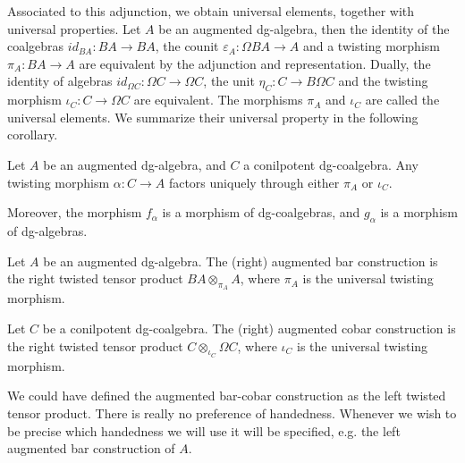 \documentclass[../thesis.tex]{subfiles}
\begin{document}
            Associated to this adjunction, we obtain universal elements, together with universal properties. Let $A$ be an augmented dg-algebra, then the identity of the coalgebras $id_{BA} : BA \rightarrow BA$, the counit $\varepsilon_A : \Omega BA \rightarrow A$ and a twisting morphism $\pi_A : BA \rightarrow A$ are equivalent by the adjunction and representation. Dually, the identity of algebras $id_{\Omega C} : \Omega C\rightarrow\Omega C$, the unit $\eta_C : C \rightarrow B\Omega C$ and the twisting morphism $\iota_C : C\rightarrow \Omega C$ are equivalent. The morphisms $\pi_A$ and $\iota_C$ are called the universal elements. We summarize their universal property in the following corollary.

            \begin{corollary}\label{cor: universal-twisting}
                Let $A$ be an augmented dg-algebra, and $C$ a conilpotent dg-coalgebra. Any twisting morphism $\alpha : C \rightarrow A$ factors uniquely through either $\pi_A$ or $\iota_C$.
                
                \begin{center}
                \end{center}
                Moreover, the morphism $f_\alpha$ is a morphism of dg-coalgebras, and $g_\alpha$ is a morphism of dg-algebras.
            \end{corollary}

            \begin{definition}
                Let $A$ be an augmented dg-algebra. The (right) augmented bar construction is the right twisted tensor product $BA \otimes_{\pi_A} A$, where $\pi_A$ is the universal twisting morphism.

                Let $C$ be a conilpotent dg-coalgebra. The (right) augmented cobar construction is the right twisted tensor product $C \otimes_{\iota_C} \Omega C$, where $\iota_C$ is the universal twisting morphism.
            \end{definition}

            \begin{remark}
                We could have defined the augmented bar-cobar construction as the left twisted tensor product. There is really no preference of handedness. Whenever we wish to be precise which handedness we will use it will be specified, e.g. the left augmented bar construction of $A$.
            \end{remark}
\end{document}
